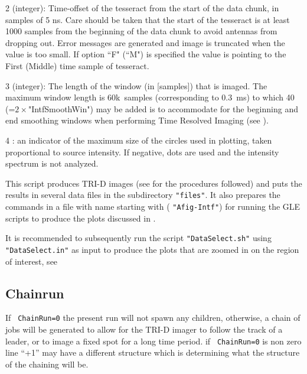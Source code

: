\begin{enumerate*}
   \item[2] (integer): Time-offset of the tesseract from the start of the data chunk, in samples of 5 ns. Care should be taken that the start of the tesseract is at least 1000 samples from the beginning of the data chunk to avoid antennas from dropping out. Error messages are generated and image is truncated when the value is too small. If option ``F" (``M") is specified the value is pointing to the First (Middle) time sample of tesseract.
   \item[3] (integer): The length of the window (in [samples]) that is imaged. The maximum window length is 60k~samples (corresponding to 0.3~ms) to which 40 (=$2\times$"IntfSmoothWin") may be added is to accommodate for the beginning and end smoothing windows when performing Time Resolved Imaging (see ).
   \item[4] : an indicator of the maximum size of the circles used in plotting, taken proportional to source intensity. If negative, dots are used and the intensity spectrum is not analyzed.
\end{enumerate*}


This script produces TRI-D images (see  for the procedures followed)
and puts the results in several data files in the subdirectory \verb!"files"!. It also prepares the commands in a file with name starting with ( \verb!"Afig-Intf"!) for running the GLE scripts \cite{GLE} to produce the plots discussed in .

It is recommended to subsequently run the script \verb!"DataSelect.sh"! using \verb!"DataSelect.in"! as input to produce the plots that are zoomed in on the region of interest, see 

\subsection{Chainrun} 

If \verb# ChainRun=0# the present run will not spawn any children, otherwise, a chain of jobs will be generated to allow for the TRI-D imager to follow the track of a leader, or to image a fixed spot for a long time period.
if \verb# ChainRun=0# is non zero line ``+1'' may have a different structure which is determining what the structure of the chaining will be.

